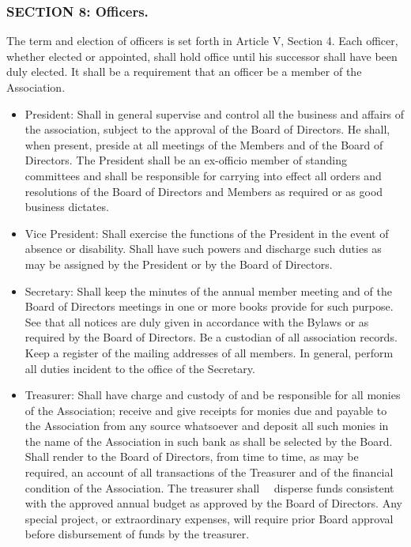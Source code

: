 \subsubsection{SECTION 8: Officers.}
The term and election of officers is set forth in Article V, Section
4. Each officer, whether elected or appointed, shall hold office until
his successor shall have been duly elected. It shall be a requirement
that an officer be a member of the Association.

\begin{itemize}
\item President:  Shall in general supervise and control all the business
and affairs of the association, subject to the approval of the Board of
Directors. He shall, when present, preside at all meetings of the Members
and of the Board of Directors. The President shall be an ex-officio
member of standing committees and shall be responsible for carrying into
effect all orders and resolutions of the Board of Directors and Members
as required or as good business dictates.

\item Vice President: Shall exercise the functions of the President in the
event of absence or disability. Shall have such powers and discharge such
duties as may be assigned by the President or by the Board of Directors.

\item Secretary: Shall keep the minutes of the annual member meeting and of
the Board of Directors meetings in one or more books provide for such
purpose. See that all notices are duly given in accordance with the
Bylaws or as required by the Board of Directors. Be a custodian of
all association records. Keep a register of the mailing addresses of
all members. In general, perform all duties incident to the office of
the Secretary.

\item Treasurer: Shall have charge and custody of and be responsible for all
monies of the Association; receive and give receipts for monies due and
payable to the Association from any source whatsoever and deposit all such
monies in the name of the Association in such bank as shall be selected
by the Board. Shall render to the Board of Directors, from time to time,
as may be required, an account of all transactions of the Treasurer
and of the financial condition of the Association. The treasurer shall
   disperse funds consistent with the approved annual budget as
approved by the Board of Directors. Any special project, or extraordinary
expenses, will require prior Board approval before disbursement of funds
by the treasurer.
\end{itemize}

